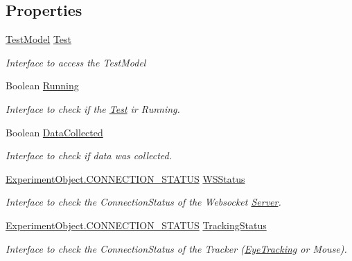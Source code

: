\subsection*{Properties}
\begin{DoxyCompactItemize}
\item 
\hyperlink{class_web_analyzer_1_1_models_1_1_data_model_1_1_test_model}{Test\+Model} \hyperlink{class_web_analyzer_1_1_controller_1_1_test_controller_afcf9572f80c31e6d9aca33f96e3aaa4f}{Test}
\begin{DoxyCompactList}\small\item\em Interface to access the Test\+Model \end{DoxyCompactList}\item 
Boolean \hyperlink{class_web_analyzer_1_1_controller_1_1_test_controller_a4020785450ade4a26f603d667ce633d6}{Running}
\begin{DoxyCompactList}\small\item\em Interface to check if the \hyperlink{namespace_web_analyzer_1_1_test}{Test} ir Running. \end{DoxyCompactList}\item 
Boolean \hyperlink{class_web_analyzer_1_1_controller_1_1_test_controller_a741cf98b95422a4a307bf8834db147b3}{Data\+Collected}
\begin{DoxyCompactList}\small\item\em Interface to check if data was collected. \end{DoxyCompactList}\item 
\hyperlink{class_web_analyzer_1_1_u_i_1_1_interaction_objects_1_1_experiment_object_a2875208b4f4b0ed643593152f4ec025c}{Experiment\+Object.\+C\+O\+N\+N\+E\+C\+T\+I\+O\+N\+\_\+\+S\+T\+A\+T\+U\+S} \hyperlink{class_web_analyzer_1_1_controller_1_1_test_controller_a1f3032c3be238b03976be19319a64eeb}{W\+S\+Status}
\begin{DoxyCompactList}\small\item\em Interface to check the Connection\+Status of the Websocket \hyperlink{namespace_web_analyzer_1_1_server}{Server}. \end{DoxyCompactList}\item 
\hyperlink{class_web_analyzer_1_1_u_i_1_1_interaction_objects_1_1_experiment_object_a2875208b4f4b0ed643593152f4ec025c}{Experiment\+Object.\+C\+O\+N\+N\+E\+C\+T\+I\+O\+N\+\_\+\+S\+T\+A\+T\+U\+S} \hyperlink{class_web_analyzer_1_1_controller_1_1_test_controller_adc0db19e3cc5958f24dd5fd09ce34d98}{Tracking\+Status}
\begin{DoxyCompactList}\small\item\em Interface to check the Connection\+Status of the Tracker (\hyperlink{namespace_web_analyzer_1_1_eye_tracking}{Eye\+Tracking} or Mouse). \end{DoxyCompactList}\end{DoxyCompactItemize}
